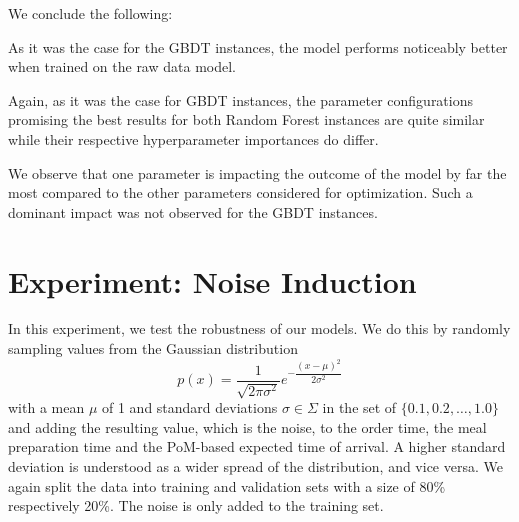 We conclude the following:
\begin{description}[font=$\bullet$\scshape\bfseries]
	\item As it was the case for the GBDT instances, the model performs noticeably better when trained on the raw data model.
	\item Again, as it was the case for GBDT instances, the parameter configurations promising the best results for both Random Forest instances are quite similar while their respective hyperparameter importances do differ. 
	\item We observe that one parameter is impacting the outcome of the model by far the most compared to the other parameters considered for optimization. Such a dominant impact was not observed for the GBDT instances.
\end{description}
\section{Experiment: Noise Induction}\label{sec:noise}
In this experiment, we test the robustness of our models. We do this by randomly sampling values from the Gaussian distribution
\begin{equation}
	p(x) = \dfrac{1}{\sqrt{2\pi\sigma^{2}}} e^{-\dfrac{(x-\mu)^2}{2\sigma^2}}
\end{equation}
with a mean $ \mu $ of 1 and standard deviations $ \sigma \in \Sigma $ in the set of $ \{0.1, 0.2, \dots, 1.0\} $ and adding the resulting value, which is the noise, to the order time, the meal preparation time and the PoM-based expected time of arrival. A higher standard deviation is understood as a wider spread of the distribution, and vice versa. We again split the data into training and validation sets with a size of 80\% respectively 20\%. The noise is only added to the training set.

